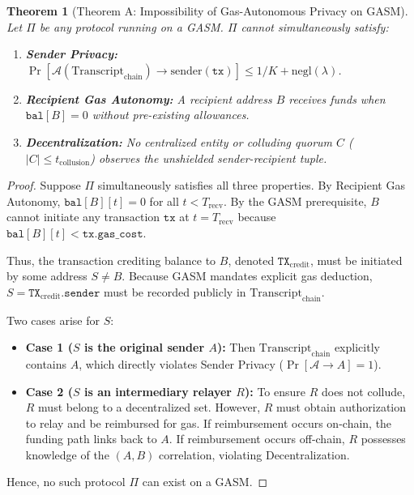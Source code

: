 \documentclass[journal,10pt,twocolumn]{IEEEtran}
\newtheorem{theorem}{Theorem}
\theoremstyle{definition}
\theoremstyle{remark}
\begin{document}
\begin{theorem}[Theorem A: Impossibility of Gas-Autonomous Privacy on GASM]\label{thm:impossibility}
Let $\Pi$ be any protocol running on a GASM. $\Pi$ cannot simultaneously satisfy:
\begin{enumerate}
    \item \textbf{Sender Privacy:} $\Pr[\mathcal{A}(\text{Transcript}_{\text{chain}}) \to \text{sender}(\mathtt{tx})] \le 1/K + \text{negl}(\lambda)$.
    \item \textbf{Recipient Gas Autonomy:} A recipient address $B$ receives funds when $\mathtt{bal}[B] = 0$ without pre-existing allowances.
    \item \textbf{Decentralization:} No centralized entity or colluding quorum $C$ ($|C| \le t_{\text{collusion}}$) observes the unshielded sender-recipient tuple.
\end{enumerate}
\end{theorem}

\begin{proof}
Suppose $\Pi$ simultaneously satisfies all three properties. By Recipient Gas Autonomy, $\mathtt{bal}[B][t] = 0$ for all $t < T_{\text{recv}}$. By the GASM prerequisite, $B$ cannot initiate any transaction $\mathtt{tx}$ at $t = T_{\text{recv}}$ because $\mathtt{bal}[B][t] < \mathtt{tx.gas\_cost}$.

Thus, the transaction crediting balance to $B$, denoted $\mathtt{TX}_{\text{credit}}$, must be initiated by some address $S \neq B$. Because GASM mandates explicit gas deduction, $S = \mathtt{TX}_{\text{credit}}.\mathtt{sender}$ must be recorded publicly in $\text{Transcript}_{\text{chain}}$.

Two cases arise for $S$:
\begin{itemize}
    \item \textbf{Case 1 ($S$ is the original sender $A$):} Then $\text{Transcript}_{\text{chain}}$ explicitly contains $A$, which directly violates Sender Privacy ($\Pr[\mathcal{A} \to A] = 1$).
    \item \textbf{Case 2 ($S$ is an intermediary relayer $R$):} To ensure $R$ does not collude, $R$ must belong to a decentralized set. However, $R$ must obtain authorization to relay and be reimbursed for gas. If reimbursement occurs on-chain, the funding path links back to $A$. If reimbursement occurs off-chain, $R$ possesses knowledge of the $(A, B)$ correlation, violating Decentralization.
\end{itemize}
Hence, no such protocol $\Pi$ can exist on a GASM.
\end{proof}
\end{document}
